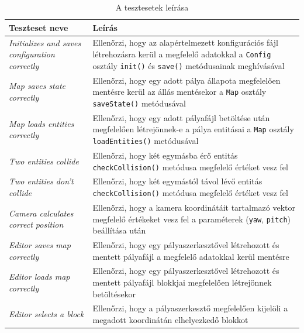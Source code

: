 \begin{table}[H]
	\centering
	\begin{tabular}{ | m{} | m{} | }
		\hline
		\textbf{Teszteset neve} & \textbf{Leírás} \\
		\hline \hline
		\emph{Initializes and saves configuration correctly} & Ellenőrzi, hogy az alapértelmezett konfigurációs fájl létrehozásra kerül a megfelelő adatokkal a \verb|Config| osztály \verb|init()| és \verb|save()| metódusainak meghívásával \\
		\hline
		\emph{Map saves state correctly} & Ellenőrzi, hogy egy adott pálya állapota megfelelően mentésre kerül az állás mentésekor a \verb|Map| osztály \verb|saveState()| metódusával \\
		\hline
		\emph{Map loads entities correctly} & Ellenőrzi, hogy egy adott pályafájl betöltése után megfelelően létrejönnek-e a pálya entitásai a \verb|Map| osztály \verb|loadEntities()| metódusával \\
		\hline
		\emph{Two entities collide} & Ellenőrzi, hogy két egymásba érő entitás \verb|checkCollision()| metódusa megfelelő értéket vesz fel \\
		\hline
		\emph{Two entities don't collide} & Ellenőrzi, hogy két egymástól távol lévő entitás \verb|checkCollision()| metódusa megfelelő értéket vesz fel \\
		\hline
		\emph{Camera calculates correct position} & Ellenőrzi, hogy a kamera koordinátáit tartalmazó vektor megfelelő értékeket vesz fel a paraméterek (\verb|yaw|, \verb|pitch|) beállítása után \\
		\hline
		\emph{Editor saves map correctly} & Ellenőrzi, hogy egy pályaszerkesztővel létrehozott és mentett pályafájl a megfelelő adatokkal kerül mentésre \\
		\hline
		\emph{Editor loads map correctly} & Ellenőrzi, hogy egy pályaszerkesztővel létrehozott és mentett pályafájl blokkjai megfelelően létrejönnek betöltésekor \\
		\hline
		\emph{Editor selects a block} & Ellenőrzi, hogy a pályaszerkesztő megfelelően kijelöli a megadott koordinátán elhelyezkedő blokkot \\
		\hline
	\end{tabular}
	\caption{A tesztesetek leírása}
	\label{tab:example-1}
\end{table}
